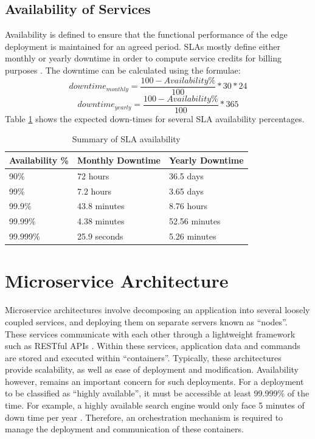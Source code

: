 \subsection{Availability of Services}
\label{subsec:svc-availability}
Availability is defined to ensure that the functional performance of the edge deployment is maintained for an agreed period. SLAs mostly define either monthly or yearly downtime in order to compute service credits for billing purposes \cite{mirobi2015service}. The downtime can be calculated using the formulae:
\[ downtime_{monthly} = \frac{100 - Availability\%}{100} * 30 * 24 \]
\[ downtime_{yearly} = \frac{100 - Availability\%}{100} * 365 \]
Table \ref{table:sla-availability} shows the expected down-times for several SLA availability percentages.

\begin{table}
    \caption{Summary of SLA availability}\label{table:sla-availability}
    \centering
    \begin{tabular}{|l|l|l|}
        \hline
        Availability \% & Monthly Downtime & Yearly Downtime\\
        \hline
        90\% & 72 hours & 36.5 days\\
        99\% & 7.2 hours & 3.65 days\\
        99.9\% & 43.8 minutes & 8.76 hours\\
        99.99\% & 4.38 minutes & 52.56 minutes\\
        99.999\% & 25.9 seconds & 5.26 minutes\\
        \hline
    \end{tabular}
\end{table}

\section{Microservice Architecture}
\label{sec:micro-svc-arc}

Microservice architectures involve decomposing an application into several loosely coupled services, and deploying them on separate servers known as ``nodes''. These services communicate with each other through a lightweight framework such as RESTful APIs \cite{li2021understanding}. Within these services, application data and commands are stored and executed within ``containers''. Typically, these architectures provide scalability, as well as ease of deployment and modification. Availability however, remains an important concern for such deployments. For a deployment to be classified as ``highly available'', it must be accessible at least 99.999\% of the time. For example, a highly available search engine would only face 5 minutes of down time per year \cite{nabi2016availability}. Therefore, an orchestration mechanism is required to manage the deployment and communication of these containers.\par

